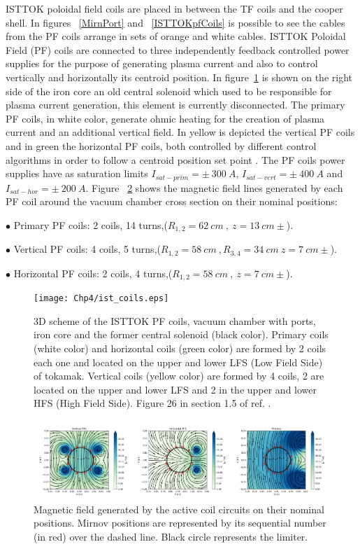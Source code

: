 ISTTOK poloidal field coils are placed in between the TF coils and the cooper shell. In figures ~\ref{MirnPort} and ~\ref{ISTTOKpfCoils} is possible to see the cables from the PF coils arrange in sets of orange and white cables. ISTTOK Poloidal Field (PF) coils are connected to three independently feedback controlled power supplies for the purpose of generating plasma current and also to control vertically and horizontally its centroid position. In figure~\ref{PF_coils} is shown on the right side of the iron core an  old central solenoid which used to be responsible for plasma current generation, this element is currently disconnected.  The primary PF coils, in white color, generate ohmic heating for the creation of plasma current and an additional vertical field. In yellow is depicted the vertical PF coils and in green the horizontal PF coils, both controlled by different control algorithms in order to follow a centroid position set point \cite{IvoPID}. The PF coils power supplies have as saturation limits $I_{sat-prim}=\pm~ 300~A$, $I_{sat-vert}=\pm~ 400~A$ and $I_{sat-hor}=\pm~ 200~A$. Figure ~\ref{PF_lines} shows the magnetic field lines generated by each PF coil around the vacuum chamber cross section on their nominal positions:\smallskip

$\bullet$ Primary PF coils: 2 coils, 14 turns,($R_{1,2}=62 ~cm~,~z=13 ~cm\pm$).
\smallskip

$\bullet$ Vertical PF coils: 4 coils, 5 turns,($R_{1,2}=58 ~cm~, R_{3,4}=34 ~cm ~z=7 ~cm\pm$).
\smallskip

$\bullet$ Horizontal PF coils: 2 coils, 4 turns,($R_{1,2}=58 ~cm~, ~z=7 ~cm\pm$).
\smallskip

\begin{figure}[htbp]
	\centering
	\texttt{[image: Chp4/ist\_coils.eps]}
	\caption{ 3D scheme of the ISTTOK PF coils, vacuum chamber with ports, iron core and the former central solenoid (black color). Primary coils (white color) and horizontal coils (green color) are formed by 2 coils each one and located on the  upper and lower LFS (Low Field Side) of tokamak. Vertical coils (yellow color) are formed by 4 coils, 2 are located on the upper and lower LFS and 2 in the upper and lower HFS (High Field Side). Figure 26 in section 1.5 of ref. \cite{Ivo}. \label{PF_coils}  }
\end{figure}

\begin{figure}[htbp]
	\centering
	\includegraphics[width=1.12\textwidth]{Chp4/PF_fieldLines.png}
	\caption{ Magnetic field generated by the active coil circuits on their nominal positions. Mirnov positions are represented by its sequential number (in red) over the dashed line. Black circle represents the limiter.\label{PF_lines}  }
\end{figure}


